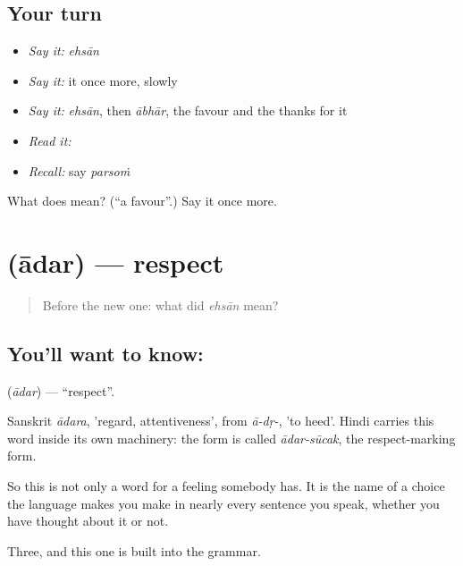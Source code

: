 \subsection*{Your turn}
\begin{itemize}
\raggedright
  \item \emph{Say it:} \emph{ehsān}
  \item \emph{Say it:} it once more, slowly
  \item \emph{Say it:} \emph{ehsān}, then \emph{ābhār}, the favour and the thanks for it
  \item \emph{Read it:} \textbf{}
  \item \emph{Recall:} say \emph{parsoṁ}
\end{itemize}

\begin{tcolorbox}[breakable,colback=teal!4,colframe=teal!35!black,title={Before you move on}]
What does  mean? (\textquotedblleft{}a favour\textquotedblright{}.) Say it once more.
\end{tcolorbox}
\section[\texorpdfstring{\hi{आदर} (ādar)}{आदर (ādar)}]{ (ādar) — respect}

\label{lesson:HI-C50-respect}



\begin{quote}
Before the new one: what did \emph{ehsān} mean?
\end{quote}

\subsection*{You'll want to know: }
\textbf{} (\emph{ādar}) — \textquotedblleft{}respect\textquotedblright{}.

Sanskrit \emph{ādara}, 'regard, attentiveness', from \emph{ā-dṛ-}, 'to heed'. Hindi carries this word inside its own machinery: the  form is called \emph{ādar-sūcak}, the respect-marking form.

So this is not only a word for a feeling somebody has. It is the name of a choice the language makes you make in nearly every sentence you speak, whether you have thought about it or not.

\begin{grammarlens}[title={What you've built}]
Three, and this one is built into the grammar.
\end{grammarlens}

